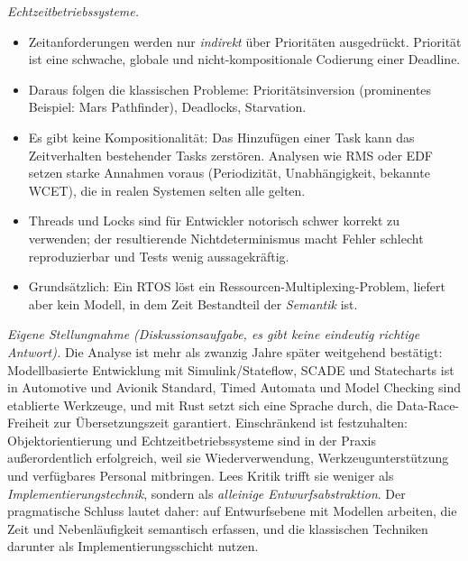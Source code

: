 \begin{loesung}
\emph{Echtzeitbetriebssysteme.}
\begin{itemize}
    \item Zeitanforderungen werden nur \emph{indirekt} über Prioritäten ausgedrückt. Priorität ist
          eine schwache, globale und nicht-kompositionale Codierung einer Deadline.
    \item Daraus folgen die klassischen Probleme: Prioritätsinversion (prominentes Beispiel: Mars
          Pathfinder), Deadlocks, Starvation.
    \item Es gibt keine Kompositionalität: Das Hinzufügen einer Task kann das Zeitverhalten
          bestehender Tasks zerstören. Analysen wie RMS oder EDF setzen starke Annahmen voraus
          (Periodizität, Unabhängigkeit, bekannte WCET), die in realen Systemen selten alle gelten.
    \item Threads und Locks sind für Entwickler notorisch schwer korrekt zu verwenden; der
          resultierende Nichtdeterminismus macht Fehler schlecht reproduzierbar und Tests wenig
          aussagekräftig.
    \item Grundsätzlich: Ein RTOS löst ein Ressourcen-Multiplexing-Problem, liefert aber kein
          Modell, in dem Zeit Bestandteil der \emph{Semantik} ist.
\end{itemize}

\emph{Eigene Stellungnahme (Diskussionsaufgabe, es gibt keine eindeutig richtige Antwort).} Die
Analyse ist mehr als zwanzig Jahre später weitgehend bestätigt: Modellbasierte Entwicklung mit
Simulink/Stateflow, SCADE und Statecharts ist in Automotive und Avionik Standard, Timed Automata
und Model Checking sind etablierte Werkzeuge, und mit Rust setzt sich eine Sprache durch, die
Data-Race-Freiheit zur Übersetzungszeit garantiert. Einschränkend ist festzuhalten: Objektorientierung
und Echtzeitbetriebssysteme sind in der Praxis außerordentlich erfolgreich, weil sie Wiederverwendung,
Werkzeugunterstützung und verfügbares Personal mitbringen. Lees Kritik trifft sie weniger als
\emph{Implementierungstechnik}, sondern als \emph{alleinige Entwurfsabstraktion}. Der pragmatische
Schluss lautet daher: auf Entwurfsebene mit Modellen arbeiten, die Zeit und Nebenläufigkeit
semantisch erfassen, und die klassischen Techniken darunter als Implementierungsschicht nutzen.
\end{loesung}

